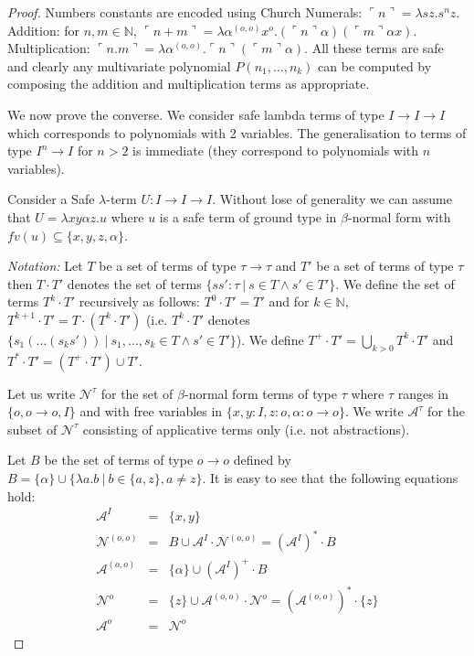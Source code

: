 \documentclass{article}
\newcommand{\encode}[1]{\ulcorner #1 \urcorner}
\newcommand{\nat}{\mathbb{N}}
\newcommand{\union}{\cup}
\newcommand{\Union}{\bigcup}
\begin{document}
\begin{proof}
Numbers constants are encoded using Church Numerals: $\encode{n} = \lambda s z. s^n z$. 
Addition: for $n,m \in \nat$, $\encode{n+m} = \lambda \alpha^{(o,o)} x^o . (\encode{n} \alpha) (\encode{m} \alpha x)$. Multiplication: $\encode{n . m} = \lambda \alpha^{(o,o)} . \encode{n} (\encode{m} \alpha)$.
All these terms are safe and clearly any multivariate polynomial $P(n_1, \ldots, n_k)$ can be computed by composing the addition and multiplication terms as appropriate.

We now prove the converse. We consider safe lambda terms of type $I\rightarrow I  \rightarrow I$ which corresponds to polynomials with 2 variables. The generalisation to terms of type $I^n \rightarrow I$ for $n>2$ is immediate (they correspond to polynomials with $n$ variables).
 
Consider a Safe $\lambda$-term $U:I\rightarrow I\rightarrow I$. Without lose of generality we can assume that $U = \lambda x y \alpha z. u$ where $u$ is a safe term of ground type in $\beta$-normal form with $fv(u) \subseteq \{ x, y, z, \alpha \}$.

\emph{Notation:} Let $T$ be a set of terms of type $\tau \rightarrow \tau$ and $T'$ be a set of terms of type $\tau$ then $T \cdot T'$ denotes the set of terms $\{ s s' : \tau \ | \ s \in T \wedge s' \in T' \}$. We define the set of terms 
$T^k \cdot T'$ recursively as follows:  $T^0 \cdot T' = T'$ and
for $k\in\nat$, $T^{k+1} \cdot T' = T \cdot (T^k \cdot T')$ (i.e. $T^k \cdot T'$ denotes $\{ s_1( \ldots (s_k s'))  \ | \ s_1, \ldots, s_k \in T \wedge s' \in T' \}$). We define $T^+\cdot T' = \Union_{k > 0} T^k \cdot T'$ and 
$T^*\cdot T' = (T^+\cdot T') \union T'$.

Let us write $\mathcal{N}^\tau$ for the set of $\beta$-normal form terms of type $\tau$ where $\tau$ ranges in $\{ o, o\rightarrow o, I  \}$ and with free variables in $\{ x,y:I, z:o, \alpha:o\rightarrow o\}$. We write $\mathcal{A}^\tau$ for the subset of $\mathcal{N}^\tau$ consisting of applicative terms only (i.e. not abstractions).

Let $B$ be the set of terms of type $o\rightarrow o$ defined by $B = \{ \alpha \} \union \{ \lambda a.b \ | \ b \in \{a,z\}, a \neq z \}$.
It is easy to see that the following equations hold:
\begin{eqnarray*}
\mathcal{A}^I &=& \{ x,y \} \\
\mathcal{N}^{(o,o)} &=& B \union \mathcal{A}^I \cdot
\mathcal{N}^{(o,o)} = (\mathcal{A}^I)^* \cdot B \\
\mathcal{A}^{(o,o)} &=& \{ \alpha \} \union (\mathcal{A}^I)^+ \cdot B \\
\mathcal{N}^o &=& \{ z \} \union \mathcal{A}^{(o,o)} \cdot \mathcal{N}^o = (\mathcal{A}^{(o,o)})^* \cdot \{ z \} \\
\mathcal{A}^o &=& \mathcal{N}^{o}
\end{eqnarray*}


\end{proof}
\end{document}
